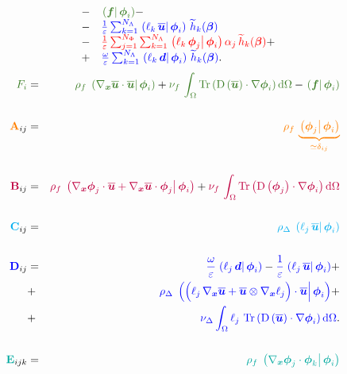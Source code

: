 \documentclass[10pt,a4paper]{article}
\begin{document}
\begin{equation}
\begin{array}{rcl}
&-&\textcolor{OliveGreen}{\prodscal{\vec f}{\vphi_i}}- \\
&-&\textcolor{blue}{\frac{1}{\varepsilon} \sum_{k=1}^{N_{\Lambda}}\prodscal{\ell_k\,\bu}{\vphi_i} \,\th_k (\vec \beta)}  \\ 
&-& \textcolor{red}{\frac{1}{\varepsilon} \sum_{j=1}^{N_\Phi}\sum_{k=1}^{N_{\Lambda}}\prodscal{\ell_k\,\vphi_j}{\vphi_i} \alpha_j\,\th_k (\vec \beta)} + \\
&+&\textcolor{blue}{ \frac{\omega}{\varepsilon} \sum_{k=1}^{N_{\Lambda}}\prodscal{\ell_k\,\vec d}{\vphi_i} \,\th_k (\vec \beta)}.
\end{array}
\end{equation}
%
\begin{eqnarray}
\textcolor{OliveGreen}{F_i} &=& \textcolor{OliveGreen}{\rho_f \, \prodscal{\grad_{\vx}\bu \cdot \bu}{\vphi_i}} + \textcolor{OliveGreen}{\nu_f\,\int_\Omega\trace{\D{\bu}\cdot\grad \vphi_i}\d\Omega}-\textcolor{OliveGreen}{\prodscal{\vec f}{\vphi_i}} \\
\\
\textcolor{orange}{\mat A}_{ij} &=&\textcolor{orange}{\rho_f \, \underbrace{\prodscal{\vphi_j}{\vphi_i}}_{\simeq \delta_{ij}}} \\
\\
\textcolor{purple}{\mat B}_{ij} &=& \textcolor{purple}{\rho_f \,\prodscal{\grad_{\vx} \vphi_j\cdot \bu + \grad_{\vx}\bu\cdot \vphi_j }{\vphi_i}} + \textcolor{purple}{\nu_f\,\int_\Omega \trace{\D{\vphi_j}\cdot\grad \vphi_i} \d \Omega} \\
\\
\textcolor{cyan}{\mat C}_{ij} &=& \textcolor{cyan}{\rho_\Delta\,\prodscal{\ell_j \, \bu}{\vphi_i}}
\\
\\
\textcolor{blue}{\mat D}_{ij} &=&  \textcolor{blue}{ \frac{\omega}{\varepsilon}\prodscal{\ell_j\,\vec d}{\vphi_i}}-\textcolor{blue}{\frac{1}{\varepsilon} \prodscal{\ell_j\,\bu}{\vphi_i}}+ \\
&+& \textcolor{blue}{\rho_\Delta\,\prodscal{\Big( \ell_j \, \grad_{\vx}\bu+ \bu\otimes\grad_{\vx}\ell_j\Big)\cdot \bu}{\vphi_i}}
+ \\
&+& \textcolor{blue}{ \nu_{\Delta} \int_\Omega\ell_j \, \trace{\D{\bu}\cdot\grad \vphi_i}\d\Omega}. \\
\\
\textcolor{Emerald}{\mat E}_{ijk} &=&  \textcolor{Emerald}{\rho_f \, \prodscal{ \grad_{\vx} \vphi_j\cdot \vphi_k }{\vphi_i}}
\\
\\

\end{eqnarray}
\end{document}

